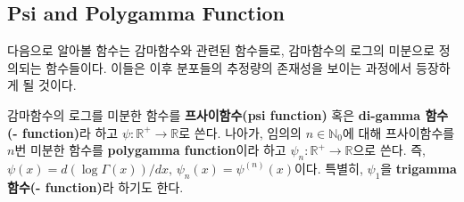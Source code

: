 \subsection{Psi and Polygamma Function}

다음으로 알아볼 함수는 감마함수와 관련된 함수들로, 감마함수의 로그의 미분으로 정의되는 함수들이다. 이들은 이후 분포들의 추정량의 존재성을 보이는 과정에서 등장하게 될 것이다.

\begin{definition}
    감마함수의 로그를 미분한 함수를 \textbf{프사이함수(psi function)} 혹은 \textbf{di-gamma 함수(- function)}라 하고 $\psi:\mathbb{R}^+\to\mathbb{R}$로 쓴다. 나아가, 임의의 $n\in\mathbb{N}_0$에 대해 프사이함수를 $n$번 미분한 함수를 \textbf{polygamma function}이라 하고 $\psi_n:\mathbb{R}^+\to\mathbb{R}$으로 쓴다. 즉, $\psi(x)=d(\log\Gamma(x))/dx,\,\psi_n(x)=\psi^{(n)}(x)$이다. 특별히, $\psi_1$을 \textbf{trigamma 함수(- function)}라 하기도 한다.
\end{definition}


